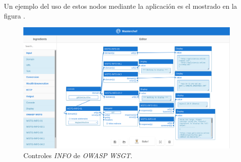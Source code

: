 Un ejemplo del uso de estos nodos mediante la aplicación es el mostrado en la figura .\sn

\begin{figure}[H]
    \centering
    \includegraphics[width=15cm]{img/tables/34_Recipe-WSTG.png}
    \caption{Controles \textit{INFO} de \textit{OWASP WSGT}.}
    \label{fig:owaspexample}
\end{figure}